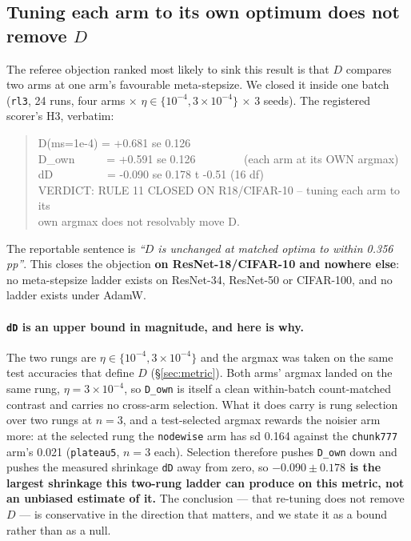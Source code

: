 \documentclass[10pt,letterpaper]{article}
\newcommand{\Dstat}{D}                         %
\newcommand{\plateau}{\texttt{plateau5}}
\newcommand{\arm}[1]{\texttt{#1}}
\begin{document}
\subsection{Tuning each arm to its own optimum does not remove \texorpdfstring{$\Dstat$}{D}}
\label{sec:rule11}

The referee objection ranked most likely to sink this result is that $\Dstat$ compares two arms
at one arm's favourable meta-stepsize. We closed it inside one batch (\arm{rl3}, 24 runs, four
arms $\times$ $\eta \in \{10^{-4}, 3\times10^{-4}\}$ $\times$ 3 seeds). The registered scorer's
H3, verbatim:

\begin{quote}\ttfamily\footnotesize
D(ms=1e-4) = +0.681  se 0.126\\
D\_own \ \ \ \ \ = +0.591  se 0.126 \ \ \ \ \ \ \ \ (each arm at its OWN argmax)\\
dD \ \ \ \ \ \ \ \ \ = -0.090  se 0.178  t -0.51 (16 df)\\
VERDICT: RULE 11 CLOSED ON R18/CIFAR-10 -- tuning each arm to its\\
own argmax does not resolvably move D.
\end{quote}

The reportable sentence is \emph{``$\Dstat$ is unchanged at matched optima to within 0.356
pp''}. This closes the objection \textbf{on ResNet-18/CIFAR-10 and nowhere else}: no
meta-stepsize ladder exists on ResNet-34, ResNet-50 or CIFAR-100, and no ladder exists under
AdamW.

\paragraph{\texttt{dD} is an upper bound in magnitude, and here is why.}
The two rungs are $\eta \in \{10^{-4}, 3\times10^{-4}\}$ and the argmax was taken on the same
test accuracies that define $\Dstat$ (\S\ref{sec:metric}). Both arms' argmax landed on the same
rung, $\eta = 3\times10^{-4}$, so \texttt{D\_own} is itself a clean within-batch count-matched
contrast and carries no cross-arm selection. What it does carry is rung selection over two rungs
at $n = 3$, and a test-selected argmax rewards the noisier arm more: at the selected rung the
\arm{nodewise} arm has sd 0.164 against the \arm{chunk777} arm's 0.021 (\plateau, $n = 3$ each).
Selection therefore pushes \texttt{D\_own} down and pushes the measured shrinkage \texttt{dD}
away from zero, so \textbf{$-0.090 \pm 0.178$ is the largest shrinkage this two-rung ladder can
produce on this metric, not an unbiased estimate of it.} The conclusion --- that re-tuning does
not remove $\Dstat$ --- is conservative in the direction that matters, and we state it as a
bound rather than as a null.
\end{document}
